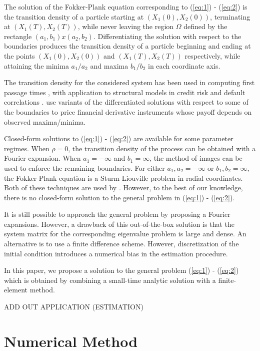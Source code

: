 \documentclass[10pt]{article}
\begin{document}
The solution of the Fokker-Plank equation corresponding to
(\ref{eq:1}) - (\ref{eq:2}) is the transition density of a particle
starting at $(X_1(0), X_2(0))$, terminating at $(X_1(T), X_2(T))$,
while never leaving the region $\Omega$ defined by the rectangle
$(a_1, b_1) x (a_2,b_2)$. Differentiating the solution with respect to the
boundaries produces the transition density of a particle
beginning and ending at the points $(X_1(0), X_2(0))$ and
$(X_1(T), X_2(T))$ respectively, while attaining the minima $a_1/a_2$
and maxima $b_1/b_2$ in each coordinate axis.

The transition density for the considered system has been used in
computing first passage times \citep{kou2016first,
  sacerdote2012first}, with application to structural models in credit
risk and default correlations \citep{haworth2008modelling,
  ching2014correlated}. \citep{he1998double} use variants of the
differentiated solutions with respect to some of the boundaries to
price financial derivative instruments whose payoff depends on
observed maxima/minima. 

Closed-form solutions to (\ref{eq:1}) - (\ref{eq:2}) are available for
some parameter regimes. When $\rho = 0$, the transition density of the
process can be obtained with a Fourier expansion. When $a_1 = -\infty$
and $b_1 = \infty$, the method of images can be used to enforce the
remaining boundaries. For either $a_1, a_2 = -\infty$ or
$b_1, b_2 = \infty$, the Fokker-Plank equation is a Sturm-Liouville
problem in radial coordinates. Both of these techniques are used by
\cite{he1998double}. However, to the best of our knowledge, there is
no closed-form solution to the general problem in (\ref{eq:1}) -
(\ref{eq:2}).

It is still possible to approach the general problem by proposing a
Fourier expansions. However, a drawback of this out-of-the-box
solution is that the system matrix for the corresponding eigenvalue
problem is large and dense. An alternative is to use a finite
difference scheme. However, discretization of the initial condition
introduces a numerical bias in the estimation procedure.

In this paper, we propose a solution to the general problem
(\ref{eq:1}) - (\ref{eq:2}) which is obtained by combining a
small-time analytic solution with a finite-element method.

ADD OUT APPLICATION (ESTIMATION)

\section{Numerical Method}
\end{document}

